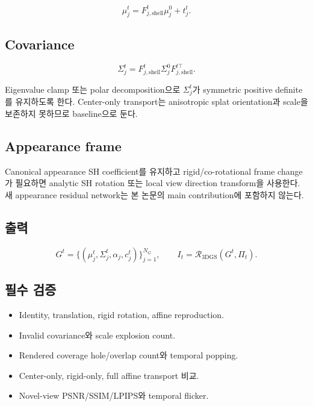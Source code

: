 \documentclass[11pt,a4paper]{article}
\begin{document}
\begin{equation}
  \mu_j^t
  =
  F_{j,\mathrm{shell}}^t\mu_j^0+t_j^t.
\end{equation}

\subsection*{Covariance}

\begin{equation}
  \Sigma_j^t
  =
  F_{j,\mathrm{shell}}^t
  \Sigma_j^0
  F_{j,\mathrm{shell}}^{t\top}.
  \label{eq:covariance-transport}
\end{equation}

Eigenvalue clamp 또는 polar decomposition으로
\(\Sigma_j^t\)가 symmetric positive definite를 유지하도록 한다.
Center-only transport는 anisotropic splat orientation과 scale을 보존하지 못하므로 baseline으로 둔다.

\subsection*{Appearance frame}

Canonical appearance SH coefficient를 유지하고
rigid/co-rotational frame change가 필요하면 analytic SH rotation 또는
local view direction transform을 사용한다.
새 appearance residual network는 본 논문의 main contribution에 포함하지 않는다.

\subsection*{출력}

\begin{equation}
  G^t
  =
  \{(\mu_j^t,\Sigma_j^t,\alpha_j,c_j^t)\}_{j=1}^{N_G},
  \qquad
  I_t=\mathcal R_{\mathrm{3DGS}}(G^t,\Pi_t).
\end{equation}

\subsection*{필수 검증}

\begin{itemize}[leftmargin=1.5em]
  \item Identity, translation, rigid rotation, affine reproduction.
  \item Invalid covariance와 scale explosion count.
  \item Rendered coverage hole/overlap count와 temporal popping.
  \item Center-only, rigid-only, full affine transport 비교.
  \item Novel-view PSNR/SSIM/LPIPS와 temporal flicker.
\end{itemize}
\end{document}
